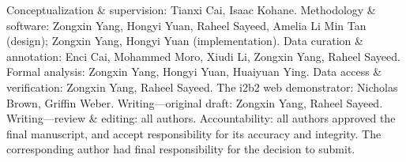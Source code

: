 Conceptualization \& supervision: Tianxi Cai, Isaac Kohane. Methodology \& software: Zongxin Yang, Hongyi Yuan, Raheel Sayeed, Amelia Li Min Tan (design); Zongxin Yang, Hongyi Yuan (implementation). Data curation \& annotation: Enci Cai, Mohammed Moro, Xiudi Li, Zongxin Yang, Raheel Sayeed. Formal analysis: Zongxin Yang, Hongyi Yuan, Huaiyuan Ying. Data access \& verification: Zongxin Yang, Raheel Sayeed. The i2b2 web demonstrator: Nicholas Brown, Griffin Weber. Writing---original draft: Zongxin Yang, Raheel Sayeed. Writing---review \& editing: all authors. Accountability: all authors approved the final manuscript, and accept responsibility for its accuracy and integrity. The corresponding author had final responsibility for the decision to submit. 
